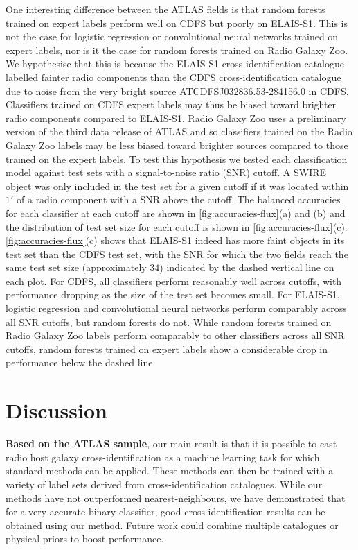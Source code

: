 \documentclass[fleqn,usenatbib,usedcolumn]{mnras}
\newcommand{\edited}[1]{{\bf {#1}}}
\begin{document}
  One interesting difference between the ATLAS fields is that random forests
  trained on expert labels perform well on CDFS but poorly on ELAIS-S1. This
  is not the case for logistic regression or convolutional neural networks
  trained on expert labels, nor is it the case for random forests trained on
  Radio Galaxy Zoo. We hypothesise that this is because the ELAIS-S1
  cross-identification catalogue \citep{middelberg08} labelled fainter radio
  components than the CDFS cross-identification catalogue \citep{norris06} due
  to noise from the very bright source
  ATCDFS\textunderscore{}J032836.53-284156.0 in CDFS. Classifiers trained on
  CDFS expert labels may thus be biased toward brighter radio components
  compared to ELAIS-S1. Radio Galaxy Zoo uses a preliminary version of the third data release of ATLAS
  \citep{franzen15} and so classifiers trained on the Radio Galaxy Zoo labels
  may be less biased toward brighter sources compared to those trained on the
  expert labels. To test this hypothesis we tested each classification model against
  test sets with a signal-to-noise ratio (SNR) cutoff. A SWIRE object was only
  included in the test set for a given cutoff if it was located within $1'$ of
  a radio component with a SNR above the cutoff. The balanced accuracies for
  each classifier at each cutoff are shown in \autoref{fig:accuracies-flux}(a)
  and (b) and the distribution of test set size for each cutoff is shown in
  \autoref{fig:accuracies-flux}(c). \autoref{fig:accuracies-flux}(c) shows
  that ELAIS-S1 indeed has more faint objects in its test set than the CDFS test set, with the SNR for
  which the two fields reach the same test set size (approximately $34$)
  indicated by the dashed vertical line on each plot. For CDFS, all
  classifiers perform reasonably well across cutoffs, with performance
  dropping as the size of the test set becomes small. For ELAIS-S1, logistic
  regression and convolutional neural networks perform comparably across all
  SNR cutoffs, but random forests do not. While random forests trained on
  Radio Galaxy Zoo labels perform comparably to other classifiers across all
  SNR cutoffs, random forests trained on expert labels show a considerable
  drop in performance below the dashed line.

\section{Discussion}

  \edited{Based on the ATLAS sample}, our main result is that it is possible
  to cast radio host galaxy cross-identification as a machine learning task
  for which standard methods can be applied. These methods can then be trained
  with a variety of label sets derived from cross-identification catalogues.
  While our methods have not outperformed nearest-neighbours, we have demonstrated that
  for a very accurate binary classifier, good cross-identification results can
  be obtained using our method. Future work could combine multiple catalogues
  or physical priors to boost performance.
\end{document}
